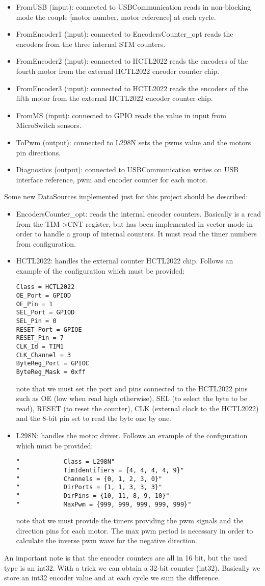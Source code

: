\begin{itemize}
\begin{itemize}
 \item FromUSB (input): connected to USBCommunication reads in non-blocking mode the couple [motor number, motor reference] at each cycle.
 \item FromEncoder1 (input): connected to EncodersCounter\_opt reads the encoders from the three internal STM counters.
 \item FromEncoder2 (input): connected to HCTL2022 reads the encoders of the fourth motor from the external HCTL2022 encoder counter chip.
 \item FromEncoder3 (input): connected to HCTL2022 reads the encoders of the fifth motor from the external HCTL2022 encoder counter chip.
 \item FromMS (input): connected to GPIO reads the value in input from MicroSwitch sensors.
 \item ToPwm (output): connected to L298N sets the pwms value and the motors pin directions.
 \item Diagnostics (output): connected to USBCommunication writes on USB interface reference, pwm and encoder counter for each motor.
 \end{itemize}
  \end{itemize}
  Some new DataSources implemented just for this project should be described:
\begin{itemize}
\item EncodersCounter\_opt: reads the internal encoder counters. Basically is a read from the TIM->CNT register, but has been implemented in vector mode in order to handle a group of internal counters. It must read the timer numbers from configuration.
\item HCTL2022: handles the external counter HCTL2022 chip. Follows an example of the configuration which must be provided:
\begin{verbatim}
Class = HCTL2022
OE_Port = GPIOD
OE_Pin = 1
SEL_Port = GPIOD
SEL_Pin = 0
RESET_Port = GPIOE
RESET_Pin = 7
CLK_Id = TIM1
CLK_Channel = 3 
ByteReg_Port = GPIOC
ByteReg_Mask = 0xff
\end{verbatim}
note that we must set the port and pins connected to the HCTL2022 pins such as OE (low when read high otherwise), SEL (to select the byte to be read), RESET (to reset the counter), CLK (external clock to the HCTL2022) and the 8-bit pin set to read the byte one by one.
\item L298N: handles the motor driver. Follows an example of the configuration which must be provided:
\begin{verbatim}
"            Class = L298N"
"            TimIdentifiers = {4, 4, 4, 4, 9}" 
"            Channels = {0, 1, 2, 3, 0}"
"            DirPorts = {1, 1, 3, 3, 3}"
"            DirPins = {10, 11, 8, 9, 10}"
"            MaxPwm = {999, 999, 999, 999, 999}"
\end{verbatim}
note that we must provide the timers providing the pwm signals and the direction pins for each motor. The max pwm period is necessary in order to calculate the inverse pwm wave for the negative direction.
\end{itemize}
An important note is that the encoder counters are all in 16 bit, but the used type is an int32. With a trick we can obtain a 32-bit counter (int32). Basically we store an int32 encoder value and at each cycle we sum the difference. 
 
